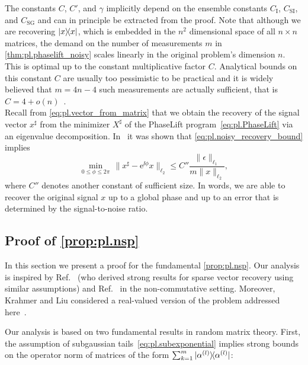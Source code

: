 The constants $C$, $C'$, and $\gamma$ implicitly depend on the ensemble constants $C_\mathrm{I}$, $C_\mathrm{SI}$, and $C_\mathrm{SG}$ and can in principle be extracted from the proof.
Note that although we are recovering $\ketbra{x}$, which is embedded in the $n^2$ dimensional space of all $n \times n$ matrices, the demand on the number of measurements $m$ in \cref{thm:pl.phaselift_noisy} scales linearly in the original problem's dimension $n$.
This is optimal up to the constant multiplicative factor $C$.
Analytical bounds on this constant $C$ are usually too pessimistic to be practical and it is widely believed that
\(
  m = 4n - 4
\)
such measurements are actually sufficient, that is $C = 4 + o(n)$~\cite{Heinosaari_2013_Quantum}.\\


Recall from \cref{eq:pl.vector_from_matrix} that we obtain the recovery of the signal vector ${x}^\sharp$ from the minimizer ${X}^\sharp$ of the PhaseLift program~\cref{eq:pl.PhaseLift} via an eigenvalue decomposition.
In~\cite{Candes_2012_Solving} it was shown that \cref{eq:pl.noisy_recovery_bound} implies
\[
  \min_{0 \leq \phi \leq 2 \pi} \, \| {x}^\sharp - \mathrm{e}^{\ii \phi} {x} \|_{\ell_2}
  \leq C'' \frac{\| \epsilon \|_{\ell_1} }{m \| {x} \|_{\ell_2}}
, \label{eq:vectorial_noisy_bound}
\]
where $C''$ denotes another constant of sufficient size.
In words, we are able to recover the original signal $x$ up to a global phase and up to an error that is determined by the signal-to-noise ratio.


\subsection{Proof of \cref{prop:pl.nsp}}%
\label{sub.nsp_proof}

In this section we present a proof for the fundamental \cref{prop:pl.nsp}.
Our analysis is inspired by Ref.~\cite{Dirksen_2017_On} (who derived strong results for sparse vector recovery using similar assumptions) and Ref.~\cite{Kabanava_2015_Stable} in the non-commutative setting.
Moreover, Krahmer and Liu considered a real-valued version of the problem addressed here~\cite{Krahmer_2018_Phase}.

Our analysis is based on two fundamental results in random matrix theory.
First, the assumption of subgaussian tails~\eqref{eq:pl.subexponential} implies strong bounds on the operator norm of matrices of the form $\sum_{k=1}^m \ketbra{\alpha\ind{l}}$:

